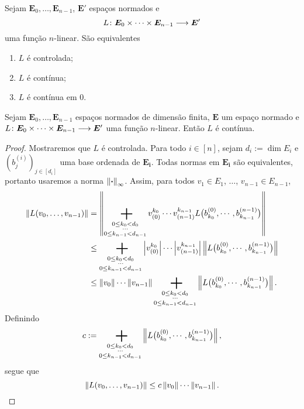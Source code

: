 \begin{exercise}
Sejam $\bm E_0,\dots,\bm E_{n-1}$, $\bm E'$ espaços normados e
	\begin{equation*}
	L\colon \allowbreak \bm E_0 \times \cdots \times \bm E_{n-1} \longrightarrow \bm E'
	\end{equation*}
uma função $n$-linear. São equivalentes
	\begin{enumerate}
	\item $L$ é controlada;
	\item $L$ é contínua;
	\item $L$ é contínua em $0$.
	\end{enumerate}
\end{exercise}

\begin{proposition}
Sejam $\bm E_0,\dots,\bm E_{n-1}$ espaços normados de dimensão finita, $\bm{E}$ um espaço normado e $L\colon \allowbreak \bm E_0 \times \cdots \times \bm E_{n-1} \longrightarrow \bm E'$ uma função $n$-linear. Então $L$ é contínua.
\end{proposition}
\begin{proof}
Mostraremos que $L$ é controlada. Para todo $i \in [n]$, sejam $d_i := \dim E_i$ e $(b^{(i)}_j)_{j \in [d_i]}$ uma base ordenada de $\bm{E_i}$. Todas normas em $\bm{E_i}$ são equivalentes, portanto usaremos a norma $\left\Vert{\bm{\cdot}}\right\Vert_\infty$. Assim, para todos $v_1 \in E_1$, $\ldots$, $v_{n-1} \in E_{n-1}$,
	\begin{align*}
	\nor{L(v_0,\ldots,v_{n-1})} &= \nor{\sum_{\substack{0 \leq k_0 < d_0\\\cdots\\0\leq k_{n-1}< d_{n-1}}} v^{k_0}_{(0)} \cdots v^{k_{n-1}}_{(n-1)} L\big(b_{k_0}^{(0)},\cdots,b_{k_{n-1}}^{(n-1)}\big)} \\
		&\leq \sum_{\substack{0 \leq k_0 < d_0\\\cdots\\0\leq k_{n-1}< d_{n-1}}} \abs{v^{k_0}_{(0)}}\cdots\abs{v^{k_{n-1}}_{(n-1)}}\nor{L\big(b_{k_0}^{(0)},\cdots,b_{k_{n-1}}^{(n-1)}\big)} \\
		&\leq \nor{v_0}\cdots\nor{v_{n-1}}\sum_{\substack{0 \leq k_0 < d_0\\\cdots\\0\leq k_{n-1}< d_{n-1}}} \nor{L\big(b_{k_0}^{(0)},\cdots,b_{k_{n-1}}^{(n-1)}\big)}.
	\end{align*}
Definindo
	\begin{equation*}
	c := \sum_{\substack{0 \leq k_0 < d_0\\\cdots\\0\leq k_{n-1}< d_{n-1}}} \nor{L\big(b_{k_0}^{(0)},\cdots,b_{k_{n-1}}^{(n-1)}\big)},
	\end{equation*}
segue que
	\begin{equation*}
	\left\Vert{L(v_0,\ldots,v_{n-1})}\right\Vert \leq c \left\Vert{v_0}\right\Vert\cdots\left\Vert{v_{n-1}}\right\Vert.
	\qedhere
	\end{equation*}
\end{proof}





